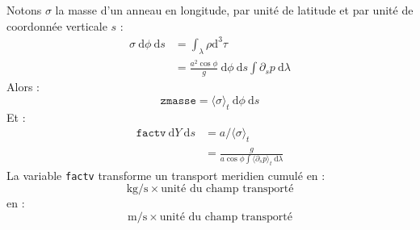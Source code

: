 \documentclass[a4paper,english,french]{article}
\newcommand{\ud}{\mathrm{d}}
\begin{document}
Notons $\sigma$ la masse d'un anneau en longitude, par unité de
latitude et par unité de coordonnée verticale $s$ :
\begin{align*}
  \sigma\ \ud \phi\ \ud s & = \int_\lambda \rho \ud^3 \tau \\
  & = \frac{a^2 \cos \phi}{g} \ \ud \phi\ \ud s \int \partial_s p\ \ud \lambda
\end{align*}
Alors :
\begin{equation*}
  \mathtt{zmasse} = \langle \sigma \rangle_t\ \ud \phi\ \ud s
\end{equation*}
Et :
\begin{align*}
  \mathtt{factv}\ \ud Y\ \ud s & = a / \langle \sigma \rangle_t \\
  & = \frac{g}{a \cos \phi \int \langle \partial_s p \rangle_t\ \ud \lambda}
\end{align*}
La variable \texttt{factv} transforme un transport
meridien cumulé en :
\begin{equation*}
  \mathrm{kg} / \mathrm{s} \times \textrm{unité du champ transporté}  
\end{equation*}
en :
\begin{equation*}
  \mathrm{m} / \mathrm{s} \times \textrm{unité du champ transporté}  
\end{equation*}
\end{document}
